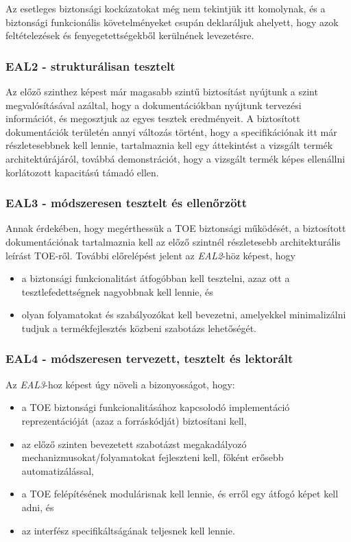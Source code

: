 Az esetleges biztonsági kockázatokat még nem tekintjük itt komolynak, és a biztonsági funkcionális
követelményeket csupán deklaráljuk ahelyett, hogy azok feltételezések és fenyegetettségekből
kerülnének levezetésre.

\subsubsection{EAL2 - strukturálisan tesztelt}
Az előző szinthez képest már magasabb szintű biztosítást nyújtunk a szint megvalósításával azáltal,
hogy a dokumentációkban nyújtunk tervezési információt, és megosztjuk az egyes tesztek eredményeit.
A biztosított dokumentációk területén annyi változás történt, hogy a specifikációnak itt már
részletesebbnek kell lennie, tartalmaznia kell egy áttekintést a vizsgált termék architektúrájáról,
továbbá demonstrációt, hogy a vizsgált termék képes ellenállni korlátozott kapacitású támadó ellen.

\subsubsection{EAL3 - módszeresen tesztelt és ellenőrzött}
Annak érdekében, hogy megérthessük a TOE biztonsági működését, a biztosított dokumentációnak
tartalmaznia kell az előző szintnél részletesebb architekturális leírást TOE-ről.
További előrelépést jelent az \emph{EAL2}-höz képest, hogy
\begin{itemize}
    \item a biztonsági funkcionalitást átfogóbban kell tesztelni, azaz ott a tesztlefedettségnek
        nagyobbnak kell lennie, és
    \item olyan folyamatokat és szabályozókat kell bevezetni, amelyekkel minimalizálni tudjuk a
        termékfejlesztés közbeni szabotázs lehetőségét.
\end{itemize}

\subsubsection{EAL4 - módszeresen tervezett, tesztelt és lektorált}

Az \emph{EAL3}-hoz képest úgy növeli a bizonyosságot, hogy:
\begin{itemize}
    \item a TOE biztonsági funkcionalitásához kapcsolodó implementáció reprezentációját
        (azaz a forráskódját) biztosítani kell,
    \item az előző szinten bevezetett szabotázst megakadályozó mechanizmusokat/folyamatokat
        fejleszteni kell, főként erősebb automatizálással,
    \item a TOE felépítésének modulárisnak kell lennie, és erről egy átfogó képet kell adni, és
    \item az interfész specifikáltságának teljesnek kell lennie.
\end{itemize}


